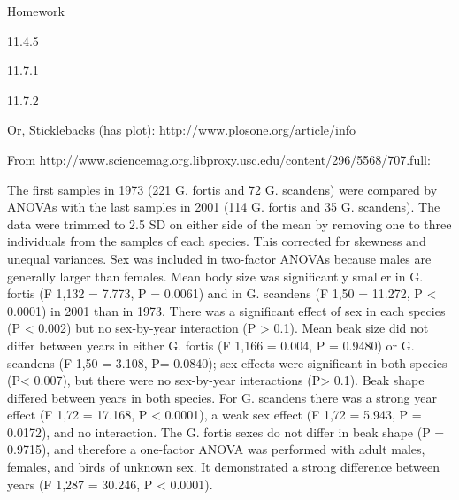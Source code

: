 \begin{frame}{Homework}
  \begin{center}

  11.4.5

  \vspace{2em}


  11.7.1

  \vspace{2em}

  11.7.2

  \end{center}
\end{frame}








Or, Sticklebacks (has plot): http://www.plosone.org/article/info%

From http://www.sciencemag.org.libproxy.usc.edu/content/296/5568/707.full:

The first samples in 1973 (221 G. fortis and 72 G. scandens) were compared by ANOVAs with the last samples in 2001 (114 G. fortis and 35 G. scandens). The data were trimmed to 2.5 SD on either side of the mean by removing one to three individuals from the samples of each species. This corrected for skewness and unequal variances. Sex was included in two-factor ANOVAs because males are generally larger than females. Mean body size was significantly smaller in G. fortis (F 1,132 = 7.773, P = 0.0061) and in G. scandens (F 1,50 = 11.272, P < 0.0001) in 2001 than in 1973. There was a significant effect of sex in each species (P < 0.002) but no sex-by-year interaction (P > 0.1). Mean beak size did not differ between years in either G. fortis (F 1,166 = 0.004, P = 0.9480) or G. scandens (F 1,50 = 3.108, P= 0.0840); sex effects were significant in both species (P< 0.007), but there were no sex-by-year interactions (P> 0.1). Beak shape differed between years in both species. For G. scandens there was a strong year effect (F 1,72 = 17.168, P < 0.0001), a weak sex effect (F 1,72 = 5.943, P = 0.0172), and no interaction. The G. fortis sexes do not differ in beak shape (P = 0.9715), and therefore a one-factor ANOVA was performed with adult males, females, and birds of unknown sex. It demonstrated a strong difference between years (F 1,287 = 30.246, P < 0.0001). 

